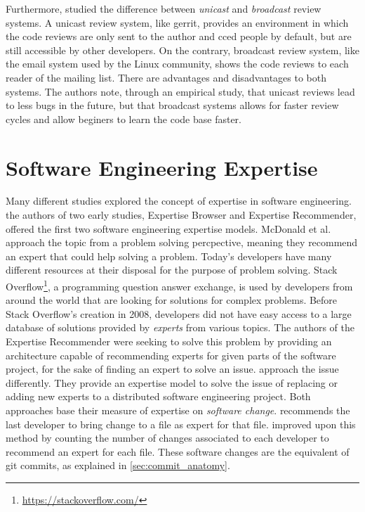 Furthermore, \citep{armstrong} studied the difference between \textit{unicast} and \textit{broadcast} review systems. A unicast review system, like gerrit, provides an environment in which the code reviews are only sent to the author and cced people by default, but are still accessible by other developers. On the contrary, broadcast review system, like the email system used by the Linux community, shows the code reviews to each reader of the mailing list. There are advantages and disadvantages to both systems. The authors note, through an empirical study, that unicast reviews lead to less bugs in the future, but that broadcast systems allows for faster review cycles and allow beginers to learn the code base faster. 



\section{Software Engineering Expertise}
\label{sec:expertise_models}

Many different studies explored the concept of expertise in software engineering. the authors of two early studies, Expertise Browser \citep{mockus02} and Expertise Recommender\citep{McDonald}, offered the first two software engineering expertise models. McDonald et al. approach the topic from a problem solving percpective, meaning they recommend an expert that could help solving a problem. Today's developers have many different resources at their disposal for the purpose of problem solving. Stack Overflow\footnote{\url{https://stackoverflow.com/}}, a programming question answer exchange, is used by developers from around the world that are looking for solutions for complex problems. Before Stack Overflow's creation in 2008, developers did not have easy access to a large database of solutions provided by \textit{experts} from various topics. The authors of the Expertise Recommender were seeking to solve this problem by providing an architecture capable of recommending experts for given parts of the software project, for the sake of finding an expert to solve an issue. \citep{mockus02} approach the issue differently. They provide an expertise model to solve the issue of replacing or adding new experts to a distributed software engineering project. Both approaches base their measure of expertise on \textit{software change}. 
\citep{McDonald} recommends the last developer to bring change to a file as expert for that file. \citep{mockus02} improved upon this method by counting the number of changes associated to each developer to recommend an expert for each file. These software changes are the equivalent of git commits, as explained in \autoref{sec:commit_anatomy}.


